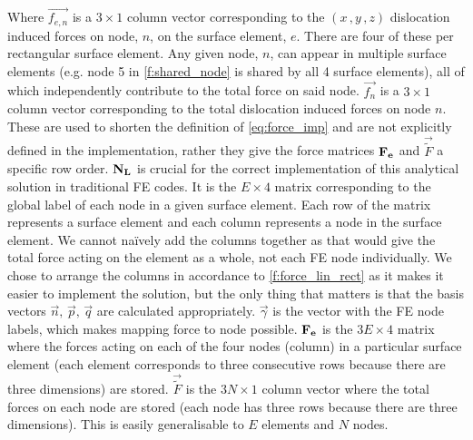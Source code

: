 Where $\vec{f_{e,n}}$ is a $3\times1$ column vector corresponding to the $(x\,,y\,,z)$ dislocation induced forces on node, $n$, on the surface element, $e$. There are four of these per rectangular surface element. Any given node, $n$, can appear in multiple surface elements (e.g. node 5 in \cref{f:shared_node} is shared by all 4 surface elements), all of which independently contribute to the total force on said node. $\vec{f_n}$ is a $3\times1$ column vector corresponding to the total dislocation induced forces on node $n$. These are used to shorten the definition of \cref{eq:force_imp} and are not explicitly defined in the implementation, rather they give the force matrices $\mathbf{F_{e}}$ and $\vec{\tilde{F}}$ a specific row order. $\mathbf{N_{L}}$ is crucial for the correct implementation of this analytical solution in traditional FE codes. It is the $E\times4$ matrix corresponding to the global label of each node in a given surface element. Each row of the matrix represents a surface element and each column represents a node in the surface element. We cannot na\"ively add the columns together as that would give the total force acting on the element as a whole, not each FE node individually. We chose to arrange the columns in accordance to \cref{f:force_lin_rect} as it makes it easier to implement the solution, but the only thing that matters is that the basis vectors $\vec{n},\,\vec{p},\,\vec{q}$ are calculated appropriately. $\vec{\gamma}$ is the vector with the FE node labels, which makes mapping force to node possible. $\mathbf{F_{e}}$ is the $3E \times 4$ matrix where the forces acting on each of the four nodes (column) in a particular surface element (each element corresponds to three consecutive rows because there are three dimensions) are stored. $\vec{\tilde{F}}$ is the $3N\times1$ column vector where the total forces on each node are stored (each node has three rows because there are three dimensions). This is easily generalisable to $E$ elements and $N$ nodes.

